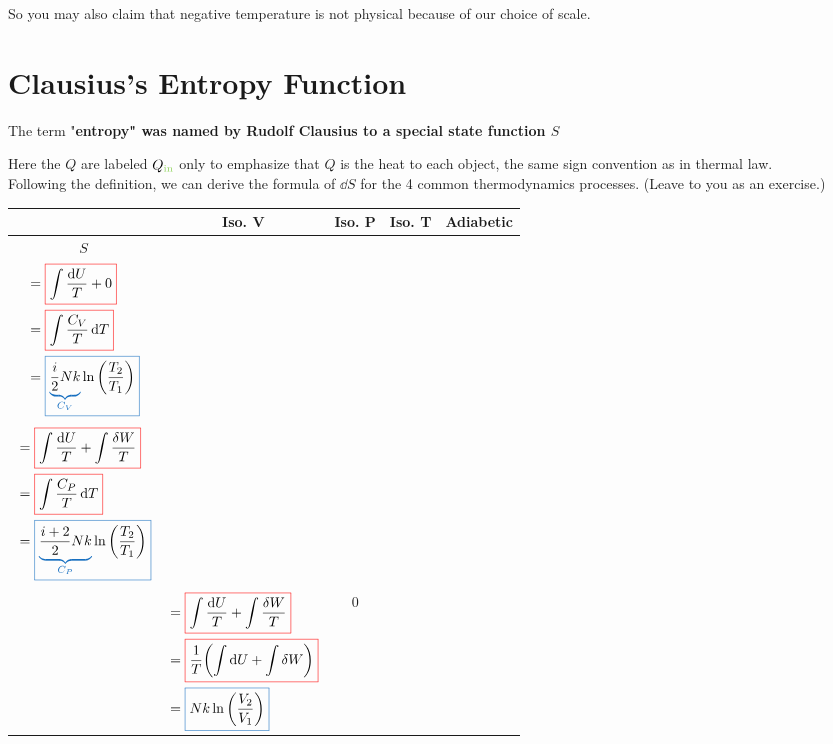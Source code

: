 \documentclass[class=article, crop=false, 12pt]{standalone}
\begin{document}
So you may also claim that negative temperature is not physical because of our choice of scale. 



\linesep
\section{Clausius's Entropy Function}

The term "\bf{entropy}" was named by Rudolf Clausius to a special state function $S$

Here the $Q$ are labeled $Q_\green{\text{in}}$ only to emphasize that 
$Q$ is the heat  to each object,
the same sign convention as in thermal  law.\\

Following the definition, 
we can derive the formula of $\dd{S}$ for the 4 common thermodynamics processes.
(Leave to you as an exercise.)

\begin{center}
    \begin{tabular}{c|c|c|c|c}
        & Iso. V & Iso. P & Iso. T & Adiabetic\\[1em]
        \hline
        $S$
        &
        \makecell{
            \phantom{\scriptsize abc}\\
            $\begin{aligned}
                &= \cbox[red]{\int \frac{\dd{U}}{T} + 0}\\
                &= \cbox[red]{\int \frac{C_V}{T} \dd{T}} \\
                &= \cbox[blue]{\cub[blue]{\frac{i}{2}Nk}{C_V}\ln\qty(\frac{T_2}{T_1})}
            \end{aligned}$\\
            \phantom{\scriptsize abc}
        }
        &
        \makecell{
            \phantom{\scriptsize abc}\\
            $\begin{aligned}
                &= \cbox[red]{\int \frac{\dd{U}}{T} + \int \frac{\var{W}}{T}}\\
                &= \cbox[red]{\int \frac{C_P}{T} \dd{T}} \\
                &= \cbox[blue]{\cub[blue]{\frac{i+2}{2}Nk}{C_P}\ln\qty(\frac{T_2}{T_1})}
            \end{aligned}$\\
            \phantom{\scriptsize abc}\\
        }
        &
        $\begin{aligned}
            &= \cbox[red]{\int \frac{\dd{U}}{T} + \int \frac{\var{W}}{T}}\\
            &= \cbox[red]{\inv{T}\qty(\int \dd{U} + \int\var{W})}\\
            &= \cbox[blue]{Nk\ln\qty(\frac{V_2}{V_1})}
        \end{aligned}$
        &
        $0$
    \end{tabular}
\end{center}
\end{document}
